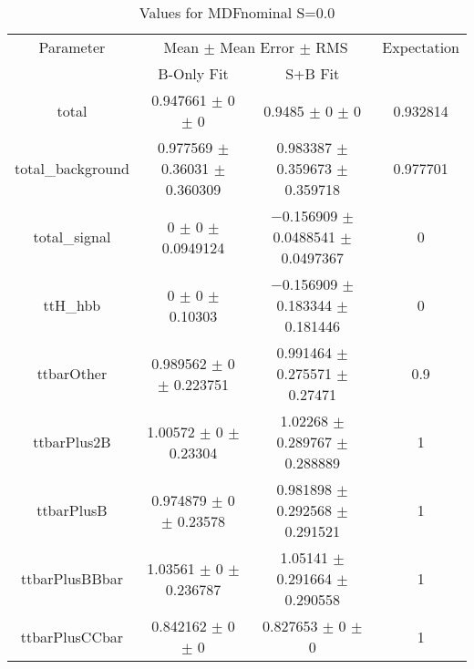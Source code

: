 \begin{table}
\centering
\caption{Values for MDFnominal S=0.0}
\begin{tabular}{cccc}
\toprule
Parameter & \multicolumn{2}{c}{Mean $\pm$ Mean Error $\pm$ RMS} & Expectation\\
 & B-Only Fit & S+B Fit & \\
\midrule
total & \num{0.947661} $\pm$ \num{0} $\pm$ \num{0} & \num{0.9485} $\pm$ \num{0} $\pm$ \num{0} & \num{0.932814}\\
total\_background & \num{0.977569} $\pm$ \num{0.36031} $\pm$ \num{0.360309} & \num{0.983387} $\pm$ \num{0.359673} $\pm$ \num{0.359718} & \num{0.977701}\\
total\_signal & \num{0} $\pm$ \num{0} $\pm$ \num{0.0949124} & \num{-0.156909} $\pm$ \num{0.0488541} $\pm$ \num{0.0497367} & \num{0}\\
ttH\_hbb & \num{0} $\pm$ \num{0} $\pm$ \num{0.10303} & \num{-0.156909} $\pm$ \num{0.183344} $\pm$ \num{0.181446} & \num{0}\\
ttbarOther & \num{0.989562} $\pm$ \num{0} $\pm$ \num{0.223751} & \num{0.991464} $\pm$ \num{0.275571} $\pm$ \num{0.27471} & \num{0.9}\\
ttbarPlus2B & \num{1.00572} $\pm$ \num{0} $\pm$ \num{0.23304} & \num{1.02268} $\pm$ \num{0.289767} $\pm$ \num{0.288889} & \num{1}\\
ttbarPlusB & \num{0.974879} $\pm$ \num{0} $\pm$ \num{0.23578} & \num{0.981898} $\pm$ \num{0.292568} $\pm$ \num{0.291521} & \num{1}\\
ttbarPlusBBbar & \num{1.03561} $\pm$ \num{0} $\pm$ \num{0.236787} & \num{1.05141} $\pm$ \num{0.291664} $\pm$ \num{0.290558} & \num{1}\\
ttbarPlusCCbar & \num{0.842162} $\pm$ \num{0} $\pm$ \num{0} & \num{0.827653} $\pm$ \num{0} $\pm$ \num{0} & \num{1}\\
\bottomrule
\end{tabular}
\end{table}